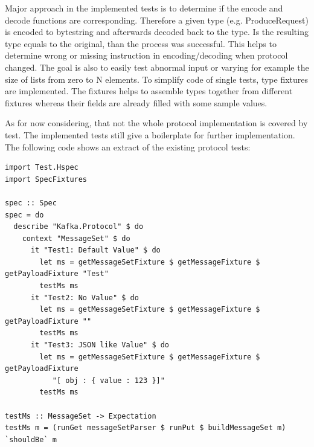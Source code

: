 Major approach in the implemented tests is to determine if the encode and decode
functions are corresponding. Therefore a given type (e.g. ProduceRequest) is
encoded to bytestring and afterwards decoded back to the type. Is the resulting
type equals to the original, than the process was successful. This helps to
determine wrong or missing instruction in encoding/decoding when protocol
changed. The goal is also to easily test abnormal input or varying
for example the size of lists from zero to N elements. To simplify code of
single tests, type fixtures are implemented. The fixtures helps to assemble
types together from different fixtures whereas their fields are already filled
with some sample values. 

As for now considering, that not the whole protocol implementation is
covered by test. The implemented tests still give a boilerplate for further
implementation. The following code shows an extract of the existing protocol tests:
\begin{lstlisting}[caption={Extract from protocol tests with hspec}]
import Test.Hspec
import SpecFixtures

spec :: Spec
spec = do
  describe "Kafka.Protocol" $ do
    context "MessageSet" $ do
      it "Test1: Default Value" $ do
        let ms = getMessageSetFixture $ getMessageFixture $ getPayloadFixture "Test"
        testMs ms
      it "Test2: No Value" $ do
        let ms = getMessageSetFixture $ getMessageFixture $ getPayloadFixture ""
        testMs ms
      it "Test3: JSON like Value" $ do
        let ms = getMessageSetFixture $ getMessageFixture $ getPayloadFixture
           "[ obj : { value : 123 }]"
        testMs ms

testMs :: MessageSet -> Expectation
testMs m = (runGet messageSetParser $ runPut $ buildMessageSet m) `shouldBe` m

\end{lstlisting}

